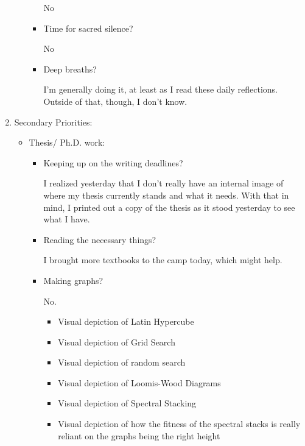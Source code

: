 \documentclass[12pt]{article}
\renewcommand{\,}{\textsuperscript{,}}
\begin{document}
\begin{enumerate}
\begin{itemize}
\begin{itemize}
No

\item Time for sacred silence?

No

\item Deep breaths?

I'm generally doing it, at least as I read these daily reflections. Outside of that, though, I don't know.

\end{itemize}

\end{itemize}

\item Secondary Priorities:

\begin{itemize}

\item Thesis/ Ph.D. work:

\begin{itemize}

\item Keeping up on the writing deadlines?

I realized yesterday that I don't really have an internal image of where my thesis currently stands and what it needs.  
With that in mind, I printed out a copy of the thesis as it stood yesterday to see what I have.

\item Reading the necessary things?

I brought more textbooks to the camp today, which might help.

\item Making graphs?

No.

\begin{itemize}

\item Visual depiction of Latin Hypercube

\item Visual depiction of Grid Search

\item Visual depiction of random search

\item Visual depiction of Loomis-Wood Diagrams

\item Visual depiction of Spectral Stacking

\item Visual depiction of how the fitness of the spectral stacks is really reliant on the graphs being the right height


\end{itemize}
\end{itemize}
\end{itemize}
\end{enumerate}
\end{document}
